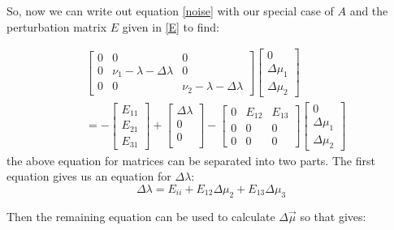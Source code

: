\documentclass[12pt]{amsart}
\theoremstyle{definition}
\numberwithin{equation}{section}
\numberwithin{equation}{section}
\theoremstyle{remark}
\numberwithin{equation}{section}
\begin{document}
So, now we can write out equation \ref{noise} with our special case of $A$ and the perturbation matrix $E$ given in \ref{E} to find:
	
	\begin{align*}
	\label{zaza3}
	&\left[
	\begin{array}{ccccccccc}
	0&0&0\\
	0&\nu_1-\lambda-\Delta\lambda&0\\
	0&0&\nu_2-\lambda-\Delta\lambda
	\end{array}
	\right]
	\left[\begin{array}{ccccccccc}
	0\\
	\Delta\mu_1\\
	\Delta\mu_2
	\end{array}\right]
	\\
	&=
	-
	\left[
	\begin{array}{ccccccccc}
	E_{11}\\
	E_{21}\\
	E_{31}
	\end{array}
	\right]+
	\left[
	\begin{array}{ccccccccc}
	\Delta\lambda\\
	0\\
	0\\
	\end{array}
	\right]
	-\left[
	\begin{array}{ccccccccc}
	0&E_{12}&E_{13}\\
	0&0&0\\
	0&0&0
	\end{array}\right]
	\left[
	\begin{array}{ccccccccc}
	0\\
	\Delta\mu_1\\
	\Delta\mu_2
	\end{array}
	\right]
	\end{align*}
the above equation for matrices can be separated into two parts. The first equation gives us an equation for $\Delta\lambda$:
	\begin{equation}
	\label{Deltalambda_1}
	\Delta\lambda=E_{ii}
	+E_{12}\Delta \mu_2+E_{13}\Delta\mu_3
	\end{equation}
	
Then the remaining equation can be used to calculate $\Delta\vec{\mu}$ so that gives:
	
\end{document}
